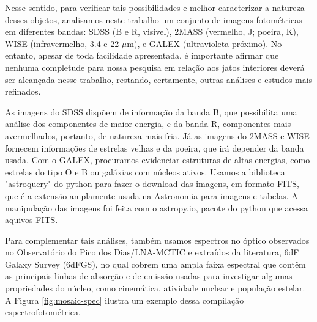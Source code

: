 Nesse sentido, para verificar tais possibilidades e melhor caracterizar a natureza desses objetos, analisamos neste trabalho um conjunto de imagens fotométricas em diferentes bandas: SDSS (B e R, visível), 2MASS (vermelho, J; poeira, K), WISE (infravermelho, 3.4 e 22 $\mu$m), e GALEX (ultravioleta próximo). No entanto, apesar de toda facilidade apresentada, é importante afirmar que nenhuma completude para nossa pesquisa em relação aos jatos interiores deverá ser alcançada nesse trabalho, restando, certamente, outras análises e estudos mais refinados.

As imagens do SDSS dispõem de informação da banda B, que
possibilita uma análise dos componentes de maior energia, e da banda R, componentes mais avermelhados, portanto, de natureza mais fria. Já as imagens do 2MASS e WISE fornecem informações de estrelas velhas e da poeira, que irá depender da banda usada. Com o GALEX, procuramos evidenciar estruturas de altas energias, como estrelas do tipo O e B ou galáxias com núcleos ativos. Usamos a biblioteca "astroquery" do python \cite{sipocz2016astroquery} para fazer o download das imagens, em formato FITS, que é a extensão amplamente usada na Astronomia para imagens e tabelas. A manipulação das imagens foi feita com o astropy.io, pacote do python que acessa aquivos FITS.

Para complementar tais análises, também usamos espectros no óptico observados no Observatório do Pico dos Dias/LNA-MCTIC e extraídos da literatura, 6dF Galaxy Survey (6dFGS), no qual cobrem uma ampla faixa espectral que contêm as principais linhas de absorção e de emissão usadas para investigar algumas propriedades do núcleo, como cinemática, atividade nuclear e população estelar. A Figura \ref{fig:mosaic-spec} ilustra um exemplo dessa compilação espectrofotométrica.

